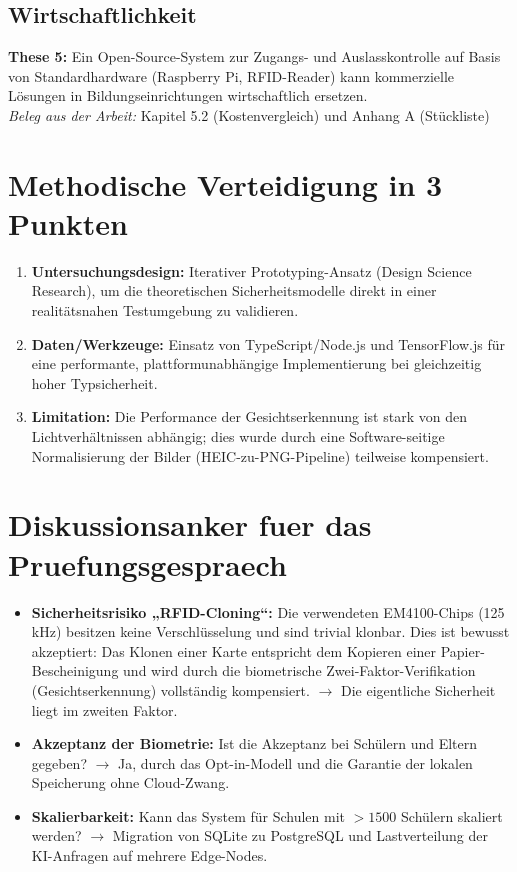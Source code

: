 \documentclass[11pt,a4paper]{article}
\begin{document}
\subsection*{Wirtschaftlichkeit}

\textbf{These 5:} Ein Open-Source-System zur Zugangs- und Auslasskontrolle auf Basis von Standardhardware (Raspberry Pi, RFID-Reader) kann kommerzielle Lösungen in Bildungseinrichtungen wirtschaftlich ersetzen.\\
\textit{Beleg aus der Arbeit:} Kapitel 5.2 (Kostenvergleich) und Anhang A (Stückliste)
\vspace{0.6cm}
\section*{Methodische Verteidigung in 3 Punkten}
\begin{enumerate}
\item \textbf{Untersuchungsdesign:} Iterativer Prototyping-Ansatz (Design Science Research), um die theoretischen Sicherheitsmodelle direkt in einer realitätsnahen Testumgebung zu validieren.
\item \textbf{Daten/Werkzeuge:} Einsatz von TypeScript/Node.js und TensorFlow.js für eine performante, plattformunabhängige Implementierung bei gleichzeitig hoher Typsicherheit.
\item \textbf{Limitation:} Die Performance der Gesichtserkennung ist stark von den Lichtverhältnissen abhängig; dies wurde durch eine Software-seitige Normalisierung der Bilder (HEIC-zu-PNG-Pipeline) teilweise kompensiert.
\end{enumerate}

\section*{Diskussionsanker fuer das Pruefungsgespraech}
\begin{itemize}
\item \textbf{Sicherheitsrisiko „RFID-Cloning“:} Die verwendeten EM4100-Chips (125\,kHz) besitzen keine Verschlüsselung und sind trivial klonbar. Dies ist bewusst akzeptiert: Das Klonen einer Karte entspricht dem Kopieren einer Papier-Bescheinigung und wird durch die biometrische Zwei-Faktor-Verifikation (Gesichtserkennung) vollständig kompensiert. $\rightarrow$ Die eigentliche Sicherheit liegt im zweiten Faktor.
\item \textbf{Akzeptanz der Biometrie:} Ist die Akzeptanz bei Schülern und Eltern gegeben? $\rightarrow$ Ja, durch das Opt-in-Modell und die Garantie der lokalen Speicherung ohne Cloud-Zwang.
\item \textbf{Skalierbarkeit:} Kann das System für Schulen mit $>1500$ Schülern skaliert werden? $\rightarrow$ Migration von SQLite zu PostgreSQL und Lastverteilung der KI-Anfragen auf mehrere Edge-Nodes.
\end{itemize}
\end{document}
